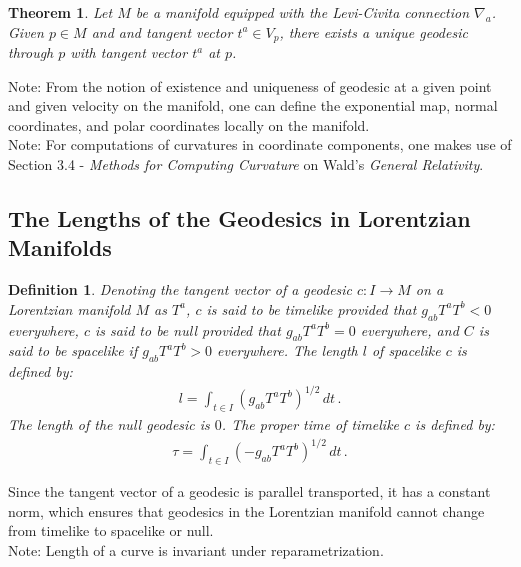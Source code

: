 \documentclass[11pt, onesided]{book}
\theoremstyle{break}
\theoremstyle{break}
\newtheorem{thm}{Theorem}[section]
\newtheorem{defn}{Definition}[thm]
\newcommand{\txt}{Wald's \textit{General Relativity}}
\newcommand{\note}{\color{red}Note: \color{black}}
\begin{document}
\begin{thm}
Let $M$ be a manifold equipped with the Levi-Civita connection $\nabla_a$. Given $p\in M$ and and tangent vector $t^a \in V_p$, there exists a unique geodesic through $p$ with tangent vector $t^a$ at $p$. 
\end{thm}

\note From the notion of existence and uniqueness of geodesic at a given point and given velocity on the manifold, one can define the exponential map, normal coordinates, and polar coordinates locally on the manifold.\\ 

\note For computations of curvatures in coordinate components, one makes use of Section 3.4 - \textit{Methods for Computing Curvature} on \txt. 

\subsection{The Lengths of the Geodesics in Lorentzian Manifolds}
\begin{defn}
Denoting the tangent vector of a geodesic $c:I \to M$ on a Lorentzian manifold $M$ as $T^a$, $c$ is said to be \textit{timelike} provided that $g_{ab}T^aT^b<0$ everywhere, $c$ is said to be \textit{null} provided that $g_{ab}T^aT^b = 0$ everywhere, and $C$ is said to be \textit{spacelike} if $g_{ab}T^aT^b >0$ everywhere. The length $l$ of spacelike $c$ is defined by:
\begin{align}
l = \int_{t \in I}(g_{ab}T^aT^b)^{1/2}\, dt\, .
\end{align}
The length of the null geodesic is $0$. The \textit{proper time} of timelike $c$ is defined by:
\begin{align}
\tau = \int_{t \in I}(-g_{ab}T^aT^b)^{1/2}\, dt\, .
\end{align}
\end{defn}
Since the tangent vector of a geodesic is parallel transported, it has a constant norm, which ensures that geodesics in the Lorentzian manifold cannot change from timelike to spacelike or null.\\

\note Length of a curve is invariant under reparametrization. \\
\end{document}
